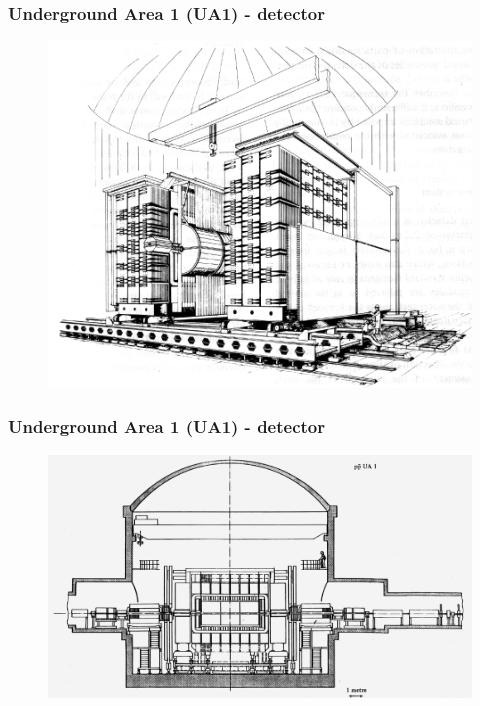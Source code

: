 \documentclass[xcolor=table]{beamer}
\begin{document}

\begin{frame}
\frametitle{Underground Area 1 (UA1) - detector}
\fontsize{9pt}{12}\selectfont

\begin{figure}[h]
\centering
\includegraphics[height=0.75\textheight]{images/ua1-overview.png}
\end{figure}

\end{frame}


\begin{frame}
\frametitle{Underground Area 1 (UA1) - detector}
\fontsize{9pt}{12}\selectfont

\begin{figure}[h]
\centering
\includegraphics[height=0.7\textheight]{images/ua1-sideview.png}
\end{figure}

\end{frame}
\end{document}
